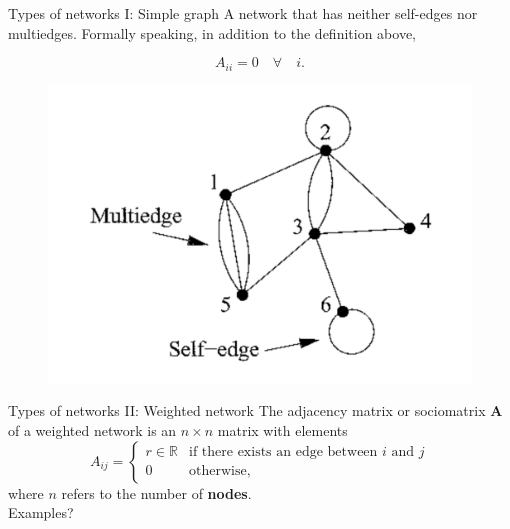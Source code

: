 \documentclass[10pt]{beamer}
\begin{document}
\begin{frame}{Types of networks I: Simple graph}
A network that has neither self-edges nor multiedges. Formally speaking, in addition to the definition above,

	\begin{equation}
	A_{ii} = 0 \quad \forall \quad i.
	\end{equation}
\end{frame}

\begin{frame}
	\begin{figure}
	\centering
	\includegraphics[scale=0.35]{Figs/weird}
	\end{figure}
\end{frame}

\begin{frame}{Types of networks II: Weighted network}
The adjacency matrix or sociomatrix \textbf{A} of a weighted network is an $n\times n$ matrix with elements
	\begin{equation}
	A_{ij} =
	\begin{cases}
	r \in \mathbb{R} & \text{if there exists an edge between $i$ and $j$}\\
	0 & \text{otherwise},
	\end{cases}
	\end{equation}
where $n$ refers to the number of \textbf{nodes}.\\

\vspace{1cm}
Examples?
\end{frame}
\end{document}
